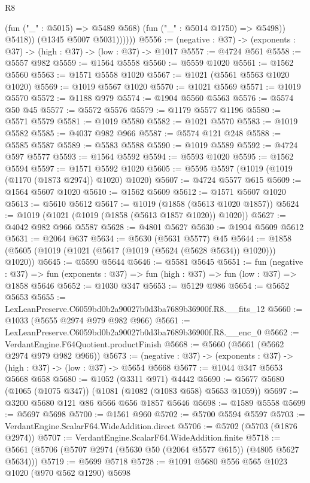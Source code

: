 \begin{lexlean}{R8}
\begin{coremodule}
                    (fun ("_" : @5015) => @5489 @568)
                    (fun ("_" : @5014 @1750) => @5498))
                  @5418))
              (@1345 @5007 @5031))))))
@5556 := (negative : @37) -> (exponents : @37) -> (high : @37) -> (low : @37) -> @1017
@5557 := @4724 @561
@5558 := @5557 @982
@5559 := @1564 @5558
@5560 := @5559 @1020
@5561 := @1562 @5560
@5563 := @1571 @5558 @1020
@5567 := @1021 (@5561 @5563 @1020 @1020)
@5569 := @1019 @5567 @1020
@5570 := @1021 @5569
@5571 := @1019 @5570
@5572 := @1188 @979
@5574 := @1904 @5560 @5563
@5576 := @5574 @50 @45
@5577 := @5572 @5576
@5579 := @1179 @5577 @1196
@5580 := @5571 @5579
@5581 := @1019 @5580
@5582 := @1021 @5570
@5583 := @1019 @5582
@5585 := @4037 @982 @966
@5587 := @5574 @121 @248
@5588 := @5585 @5587
@5589 := @5583 @5588
@5590 := @1019 @5589
@5592 := @4724 @597 @5577
@5593 := @1564 @5592
@5594 := @5593 @1020
@5595 := @1562 @5594
@5597 := @1571 @5592 @1020
@5605 := @5595 @5597 (@1019 (@1019 (@1170 (@1873 @2974)) @1020) @1020)
@5607 := @4724 @5577 @615
@5609 := @1564 @5607 @1020
@5610 := @1562 @5609
@5612 := @1571 @5607 @1020
@5613 := @5610 @5612
@5617 := @1019 (@1858 (@5613 @1020 @1857))
@5624 := @1019 (@1021 (@1019 (@1858 (@5613 @1857 @1020)) @1020))
@5627 := @4042 @982 @966 @5587
@5628 := @4801 @5627
@5630 := @1904 @5609 @5612
@5631 := @2064 @637
@5634 := @5630 (@5631 @5577) @45
@5644 := @1858 (@5605 (@1019 (@1021 (@5617 (@1019 (@5624 (@5628 @5634)) @1020))) @1020))
@5645 := @5590 @5644
@5646 := @5581 @5645
@5651 := fun (negative : @37) =>
  fun (exponents : @37) => fun (high : @37) => fun (low : @37) => @1858 @5646
@5652 := @1030 @347
@5653 := @5129 @986
@5654 := @5652 @5653
@5655 := LexLeanPreserve.C6059bd0b2a90027b0d3ba7689b36900f.R8.__fits_12
@5660 := @1033 (@5655 @2974 @979 @982 @966)
@5661 := LexLeanPreserve.C6059bd0b2a90027b0d3ba7689b36900f.R8.__enc_0
@5662 := VerdantEngine.F64Quotient.productFinish
@5668 := @5660 (@5661 (@5662 @2974 @979 @982 @966))
@5673 := (negative : @37) -> (exponents : @37) -> (high : @37) -> (low : @37) -> @5654 @5668
@5677 := @1044 @347 @5653 @5668 @658
@5680 := @1052 (@3311 @971) @4442
@5690 := @5677 @5680 (@1065 (@1075 @347)) (@1081 (@1082 (@1083 @658) @5653 @1059))
@5697 := @3200 @5680 @121 @86 @566 @656 @1857 @5646
@5698 := @1589 @5558
@5699 := @5697 @5698
@5700 := @1561 @960
@5702 := @5700 @5594 @5597
@5703 := VerdantEngine.ScalarF64.WideAddition.direct
@5706 := @5702 (@5703 (@1876 @2974))
@5707 := VerdantEngine.ScalarF64.WideAddition.finite
@5718 := @5661 (@5706 (@5707 @2974 (@5630 @50 (@2064 @5577 @615)) (@4805 @5627 @5634)))
@5719 := @5699 @5718
@5728 := @1091 @5680 @556 @565 @1023 @1020 (@970 @562 @1290) @5698

\end{coremodule}
\end{lexlean}
